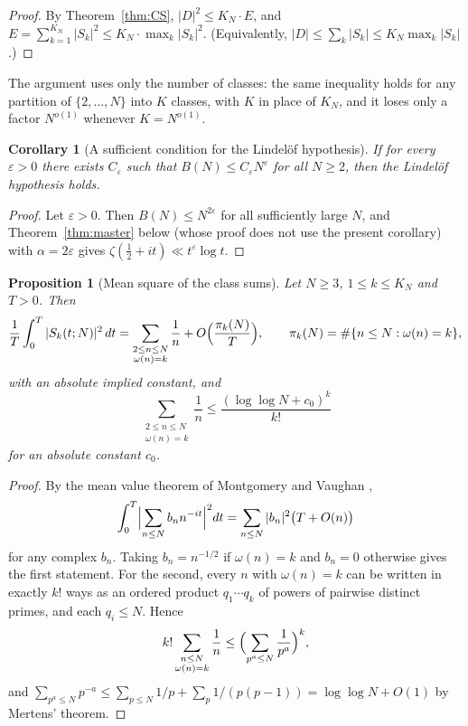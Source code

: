 \documentclass[11pt]{amsart}
\newtheorem{proposition}[theorem]{Proposition}
\newtheorem{corollary}[theorem]{Corollary}
\theoremstyle{definition}
\theoremstyle{remark}
\newcommand{\half}{\tfrac{1}{2}}
\begin{document}
\begin{proof}
By Theorem~\ref{thm:CS}, $|D|^2 \le K_N \cdot E$, and
$E = \sum_{k=1}^{K_N} |S_k|^2 \le K_N \cdot \max_k |S_k|^2$.
(Equivalently, $|D|\le\sum_k|S_k|\le K_N\max_k|S_k|$.)
\end{proof}

The argument uses only the number of classes: the same inequality holds
for any partition of $\{2,\dots,N\}$ into $K$ classes, with $K$ in place
of $K_N$, and it loses only a factor $N^{o(1)}$ whenever $K=N^{o(1)}$.

\begin{corollary}[A sufficient condition for the Lindel\"of hypothesis]
\label{cor:lindelof}
If for every $\varepsilon > 0$ there exists $C_\varepsilon$ such that
$B(N) \le C_\varepsilon N^\varepsilon$ for all $N\ge2$, then the Lindel\"of
hypothesis holds.
\end{corollary}

\begin{proof}
Let $\varepsilon>0$.  Then $B(N)\le N^{2\varepsilon}$ for all sufficiently
large $N$, and Theorem~\ref{thm:master} below (whose proof does not use the
present corollary) with $\alpha = 2\varepsilon$ gives
$\zeta(\half+it)\ll t^{\varepsilon}\log t$.
\end{proof}

\begin{proposition}[Mean square of the class sums]
\label{prop:stronger}
Let $N\ge3$, $1\le k\le K_N$ and $T>0$.  Then
\[
  \frac1T\int_0^T |S_k(t;N)|^2\,dt
  =\sum_{\substack{2\le n\le N\\ \omega(n)=k}}\frac1n
  +O\Bigl(\frac{\pi_k(N)}{T}\Bigr),
  \qquad \pi_k(N)=\#\{n\le N:\omega(n)=k\},
\]
with an absolute implied constant, and
\[
  \sum_{\substack{2\le n\le N\\ \omega(n)=k}}\frac1n
  \le\frac{(\log\log N+c_0)^k}{k!}
\]
for an absolute constant $c_0$.
\end{proposition}

\begin{proof}
By the mean value theorem of Montgomery and Vaughan
\cite[Corollary~3]{montgomery-vaughan1974},
\[
  \int_0^T\Bigl|\sum_{n\le N}b_nn^{-it}\Bigr|^2dt
  =\sum_{n\le N}|b_n|^2\bigl(T+O(n)\bigr)
\]
for any complex $b_n$.  Taking $b_n=n^{-1/2}$ if $\omega(n)=k$ and $b_n=0$
otherwise gives the first statement.  For the second, every $n$ with
$\omega(n)=k$ can be written in exactly $k!$ ways as an ordered product
$q_1\cdots q_k$ of powers of pairwise distinct primes, and each
$q_i\le N$.  Hence
\[
  k!\sum_{\substack{n\le N\\ \omega(n)=k}}\frac1n
  \le\Bigl(\sum_{p^a\le N}\frac1{p^a}\Bigr)^k,
\]
and
$\sum_{p^a\le N}p^{-a}\le\sum_{p\le N}1/p+\sum_p1/(p(p-1))
=\log\log N+O(1)$ by Mertens' theorem.
\end{proof}
\end{document}
